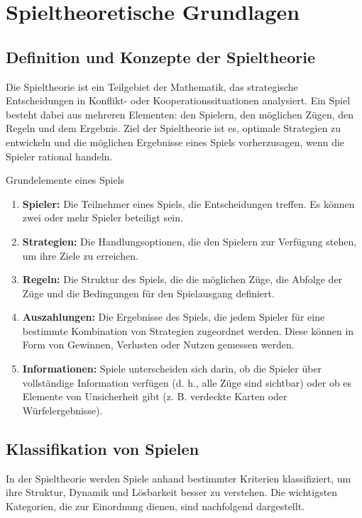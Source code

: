 \chapter{Spieltheoretische Grundlagen}


\section{Definition und Konzepte der Spieltheorie}
Die Spieltheorie ist ein Teilgebiet der Mathematik, das strategische Entscheidungen in Konflikt- oder Kooperationssituationen analysiert. Ein Spiel besteht dabei aus mehreren Elementen: den Spielern, den möglichen Zügen, den Regeln und dem Ergebnis. Ziel der Spieltheorie ist es, optimale Strategien zu entwickeln und die möglichen Ergebnisse eines Spiels vorherzusagen, wenn die Spieler rational handeln.

Grundelemente eines Spiels

\begin{enumerate}
	\item \textbf{Spieler:} Die Teilnehmer eines Spiels, die Entscheidungen treffen. Es können zwei oder mehr Spieler beteiligt sein.
	\item \textbf{Strategien:} Die Handlungsoptionen, die den Spielern zur Verfügung stehen, um ihre Ziele zu erreichen.
	\item \textbf{Regeln:} Die Struktur des Spiels, die die möglichen Züge, die Abfolge der Züge und die Bedingungen für den Spielausgang definiert.
	\item \textbf{Auszahlungen:} Die Ergebnisse des Spiels, die jedem Spieler für eine bestimmte Kombination von Strategien zugeordnet werden. Diese können in Form von Gewinnen, Verlusten oder Nutzen gemessen werden.
	\item \textbf{Informationen:} Spiele unterscheiden sich darin, ob die Spieler über vollständige Information verfügen (d. h., alle Züge sind sichtbar) oder ob es Elemente von Unsicherheit gibt (z. B. verdeckte Karten oder Würfelergebnisse).
\end{enumerate}
\section{Klassifikation von Spielen}
In der Spieltheorie werden Spiele anhand bestimmter Kriterien klassifiziert, um ihre Struktur, Dynamik und Lösbarkeit besser zu verstehen. Die wichtigsten Kategorien, die zur Einordnung dienen, sind nachfolgend dargestellt.


